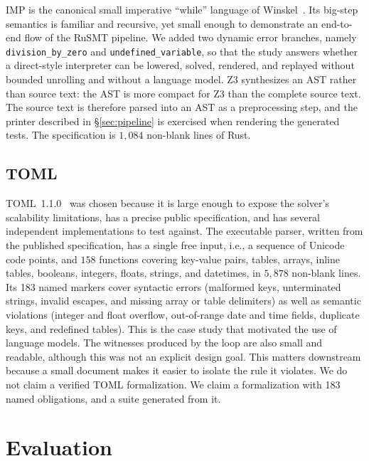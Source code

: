\documentclass[sigconf,screen]{acmart}
\theoremstyle{definition}
\theoremstyle{remark}
\newcommand{\rusmt}{RuSMT}
\newcommand{\imp}{IMP}
\newcommand{\toml}{TOML}
\newcommand{\code}[1]{\texttt{#1}}
\newcommand{\markers}{183}       %
\begin{document}
\imp{} is the canonical small imperative ``while'' language of
Winskel~\cite{winskel1993}. Its big-step semantics is familiar and recursive, yet small enough to demonstrate an end-to-end flow of the \rusmt{} pipeline. We added
two dynamic error branches, namely \code{division\_by\_zero} and
\code{undefined\_variable}, so that the study answers whether a direct-style interpreter can be
lowered, solved, rendered, and replayed without bounded unrolling and without a
language model. Z3 synthesizes an AST rather than source text: the AST is more compact for Z3 than the complete source text. The source text is therefore parsed into an AST as a preprocessing step, and the printer described in \S\ref{sec:pipeline} is exercised when rendering the generated tests. The specification is $1{,}084$ non-blank lines of Rust.

\subsection{\toml{}}
\label{sec:tomlcase}

\toml{}~1.1.0~\cite{tomlspec} was chosen because it is large enough to expose the solver's scalability limitations, has a precise public specification, and has several independent implementations to test against. The executable parser, written
from the published specification, has a single free input, i.e., a sequence of
Unicode code points, and $158$ functions covering key-value pairs,
tables, arrays, inline tables, booleans, integers, floats, strings, and
datetimes, in $5{,}878$ non-blank lines. Its \markers{} named markers cover
syntactic errors (malformed keys, unterminated strings, invalid escapes, and
missing array or table delimiters) as well as semantic violations (integer and
float overflow, out-of-range date and time fields, duplicate keys, and
redefined tables). This is the case study that motivated the use of language models. The witnesses produced by the loop are also small and readable, although this was not an explicit design goal. This matters downstream because a small document makes it easier to isolate the rule it violates. We do
not claim a verified \toml{} formalization. We claim a
formalization with \markers{} named obligations, and a suite generated from it.

\section{Evaluation}
\label{sec:eval}
\end{document}
